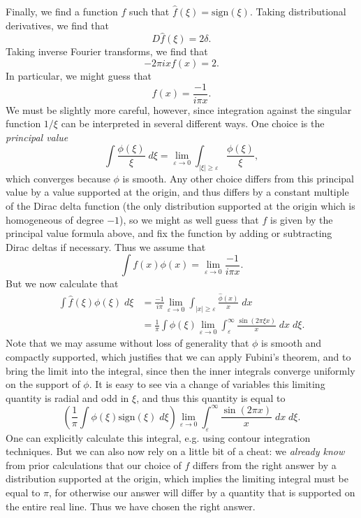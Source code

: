\documentclass[answers]{exam}
\theoremstyle{problemstyle}
\newcommand{\1}[1]{\textbf{1}_{\left[#1\right]}} %
\begin{document}
\begin{questions}
\begin{solution}
    Finally, we find a function $f$ such that $\widehat{f}(\xi) = \text{sign}(\xi)$. Taking distributional derivatives, we find that
    \[ D \widehat{f}(\xi) = 2 \delta. \]
    Taking inverse Fourier transforms, we find that
    \[ - 2 \pi i x f(x) = 2. \]
    In particular, we might guess that
    \[ f(x) = \frac{-1}{i \pi x}. \]
    We must be slightly more careful, however, since integration against the singular function $1/\xi$ can be interpreted in several different ways. One choice is the \emph{principal value}
    \[ \int \frac{\phi(\xi)}{\xi}\; d\xi = \lim_{\varepsilon \to 0} \int_{|\xi| \geq \varepsilon} \frac{\phi(\xi)}{\xi}, \]
    which converges because $\phi$ is smooth. Any other choice differs from this principal value by a value supported at the origin, and thus differs by a constant multiple of the Dirac delta function (the only distribution supported at the origin which is homogeneous of degree $-1$), so we might as well guess that $f$ is given by the principal value formula above, and fix the function by adding or subtracting Dirac deltas if necessary. Thus we assume that
    \[ \int f(x) \phi(x) = \lim_{\varepsilon \to 0} \frac{-1}{i \pi x}. \]
    But we now calculate that
    \begin{align*}
    	\int \widehat{f}(\xi) \phi(\xi)\; d\xi &= \frac{-1}{i \pi} \lim_{\varepsilon \to 0} \int_{|x| \geq \varepsilon} \frac{\widehat{\phi}(x)}{x}\; dx\\
    	&= \frac{1}{\pi} \int \phi(\xi) \lim_{\varepsilon \to 0} \int_\varepsilon^\infty \frac{\sin(2 \pi \xi x)}{x}\; dx\; d\xi.
    \end{align*}
    Note that we may assume without loss of generality that $\phi$ is smooth and compactly supported, which justifies that we can apply Fubini's theorem, and to bring the limit into the integral, since then the inner integrals converge uniformly on the support of $\phi$. It is easy to see via a change of variables this limiting quantity is radial and odd in $\xi$, and thus this quantity is equal to
    \[ \left( \frac{1}{\pi} \int \phi(\xi) \text{sign}(\xi)\; d\xi \right) \lim_{\varepsilon \to 0} \int_\varepsilon^\infty \frac{\sin(2 \pi x)}{x}\; dx\; d\xi. \]
    One can explicitly calculate this integral, e.g. using contour integration techniques. But we can also now rely on a little bit of a cheat: we \emph{already know} from prior calculations that our choice of $f$ differs from the right answer by a distribution supported at the origin, which implies the limiting integral must be equal to $\pi$, for otherwise our answer will differ by a quantity that is supported on the entire real line. Thus we have chosen the right answer.


\end{solution}
\end{questions}
\end{document}
